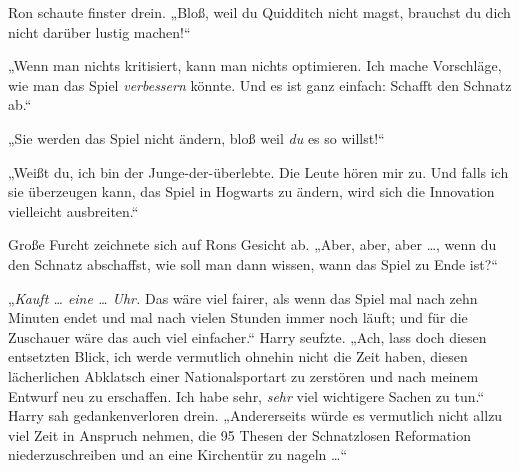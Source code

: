 Ron schaute finster drein.
„Bloß, weil du Quidditch nicht magst, brauchst du dich nicht darüber lustig machen!“

„Wenn man nichts kritisiert, kann man nichts optimieren. Ich mache Vorschläge, wie man das Spiel \emph{verbessern} könnte. Und es ist ganz einfach: Schafft den Schnatz ab.“

„Sie werden das Spiel nicht ändern, bloß weil \emph{du} es so willst!“

„Weißt du, ich bin der Junge-der-überlebte. Die Leute hören mir zu. Und falls ich sie überzeugen kann, das Spiel in Hogwarts zu ändern, wird sich die Innovation vielleicht ausbreiten.“

Große Furcht zeichnete sich auf Rons Gesicht ab.
„Aber, aber, aber …, wenn du den Schnatz abschaffst, wie soll man dann wissen, wann das Spiel zu Ende ist?“

„\emph{Kauft … eine … Uhr.} Das wäre viel fairer, als wenn das Spiel mal nach zehn Minuten endet und mal nach vielen Stunden immer noch läuft; und für die Zuschauer wäre das auch viel einfacher.“ Harry seufzte.
„Ach, lass doch diesen entsetzten Blick, ich werde vermutlich ohnehin nicht die Zeit haben, diesen lächerlichen Abklatsch einer Nationalsportart zu zerstören und nach meinem Entwurf neu zu erschaffen. Ich habe sehr, \emph{sehr} viel wichtigere Sachen zu tun.“ Harry sah gedankenverloren drein.
„Andererseits würde es vermutlich nicht allzu viel Zeit in Anspruch nehmen, die 95 Thesen der Schnatzlosen Reformation niederzuschreiben und an eine Kirchentür zu nageln …“

